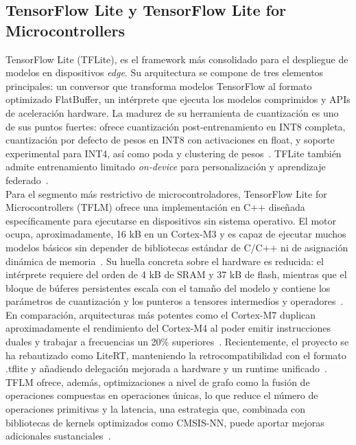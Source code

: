 \documentclass[a4paper,12pt,twoside,final]{book}
\begin{document}
\subsection{TensorFlow Lite y TensorFlow Lite for Microcontrollers}
TensorFlow Lite (TFLite), es  el framework más consolidado para el despliegue de modelos en dispositivos
\textit{edge}. Su arquitectura se compone de tres elementos principales: un conversor que transforma modelos
TensorFlow al formato optimizado FlatBuffer, un intérprete que ejecuta los modelos comprimidos y APIs de aceleración
hardware. La madurez de su herramienta de cuantización es uno de sus puntos fuertes: ofrece cuantización
post-entrenamiento en INT8 completa, cuantización por defecto de pesos en INT8 con activaciones en float, y soporte
experimental para INT4, así como poda y clustering de pesos~\cite{somvanshi2025acm}. TFLite también admite
entrenamiento limitado \textit{on-device} para personalización y aprendizaje
federado~\cite{abushahla2025nnquantization}.\\

Para el segmento más restrictivo de microcontroladores, TensorFlow Lite for Microcontrollers (TFLM) ofrece una
implementación en C$+$$+$ diseñada específicamente para ejecutarse en dispositivos sin sistema operativo. El motor
ocupa, aproximadamente, 16 kB en un Cortex-M3 y es capaz de ejecutar muchos modelos básicos sin depender de
bibliotecas estándar de C/C$+$$+$ ni de asignación dinámica de memoria~\cite{abadade2023ieeeaccess}. Su huella concreta
sobre el hardware es reducida: el intérprete requiere del orden de 4 kB de SRAM y 37 kB de flash, mientras que el
bloque de búferes persistentes escala con el tamaño del modelo y contiene los parámetros de cuantización y los
punteros a tensores intermedios y operadores~\cite{banbury2020mlperf}. En comparación, arquitecturas más potentes
como el Cortex-M7 duplican aproximadamente el rendimiento del Cortex-M4 al poder emitir instrucciones duales y
trabajar a frecuencias un 20\% superiores~\cite{banbury2020mlperf}. Recientemente, el proyecto se ha rebautizado
como LiteRT, manteniendo la retrocompatibilidad con el formato .tflite y añadiendo delegación mejorada a hardware y
un runtime unificado~\cite{abushahla2025nnquantization}. TFLM ofrece, además, optimizaciones a nivel de grafo como
la fusión de operaciones compuestas en operaciones únicas, lo que reduce el número de operaciones primitivas y la
latencia, una estrategia que, combinada con bibliotecas de kernels optimizados como CMSIS-NN, puede aportar mejoras
adicionales sustanciales~\cite{lin2020nips}.
\end{document}
